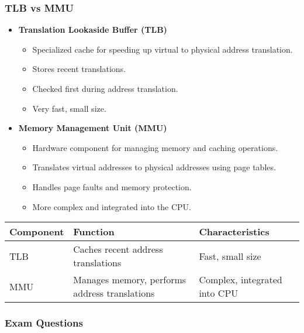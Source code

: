 \begin{frame}
    \frametitle{TLB vs MMU}

    \begin{itemize}
        \item \textbf{Translation Lookaside Buffer (TLB)}
        \begin{itemize}
            \item Specialized cache for speeding up virtual to physical address translation.
            \item Stores recent translations.
            \item Checked first during address translation.
            \item Very fast, small size.
        \end{itemize}
        \item \textbf{Memory Management Unit (MMU)}
        \begin{itemize}
            \item Hardware component for managing memory and caching operations.
            \item Translates virtual addresses to physical addresses using page tables.
            \item Handles page faults and memory protection.
            \item More complex and integrated into the CPU.
        \end{itemize}
    \end{itemize}
    
    \begin{table}[h!]
        \centering
        \begin{tabular}{|p{2cm}|p{3cm}|p{3cm}|}
            \hline
            \textbf{Component} & \textbf{Function} & \textbf{Characteristics} \\
            \hline
            TLB & Caches recent address translations & Fast, small size \\
            \hline
            MMU & Manages memory, performs address translations & Complex, integrated into CPU \\
            \hline
        \end{tabular}
    \end{table}

\end{frame}

\begin{frame}
    \frametitle{Exam Questions}
    
\end{frame}
